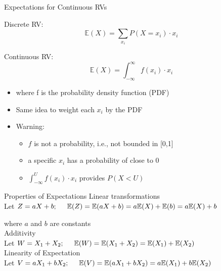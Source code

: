 \documentclass[aspectratio=169]{../latex_main/tntbeamer}  %
\begin{document}
	\begin{frame}{Expectations for Continuous RVs}
	
        Discrete RV:
	    \begin{equation}
	        \mathbb{E}(X) =  \sum_{x_i} P(X= x_i) \cdot x_i \nonumber
	    \end{equation}
	    
	    Continuous RV:
	    \begin{equation}
	        \mathbb{E}(X) =  \int^{\infty}_{-\infty} f(x_i) \cdot x_i \nonumber
	    \end{equation}
	    
	    \begin{itemize}
	        \item where f is the probability density function (PDF)
	        \item Same idea to weight each $x_i$ by the PDF
	        \item \alert{Warning}: 
	        \begin{itemize}
	            \item $f$ is not a probability, i.e., not bounded in [0,1]
	            \item a specific $x_i$ has a probability of close to $0$
	            \item $\int^{U}_{-\infty} f(x_i) \cdot x_i$ provides $P(X<U)$
	        \end{itemize}
	        
	    \end{itemize}
	    
	\end{frame}
	
	
	
	\begin{frame}[c]{Properties of Expectations}
	    Linear transformations\\
	    Let $Z = aX + b;\hspace{5mm} \mathbb{E}(Z) = \mathbb{E}( aX + b) = a\mathbb{E}(X) + \mathbb{E}(b) = a\mathbb{E}(X) + b$
	    
	    where $a$ and $b$ are constants\\[2em]
	    
	    Additivity\\
	    Let $W = X_1 + X_2; \hspace{5mm} \mathbb{E}(W) = \mathbb{E}( X_1 + X_2) =  \mathbb{E}( X_1) + \mathbb{E}(X_2)$\\[2em]

	    Linearity of Expectation\\
	    Let $V = aX_1 + bX_2;\hspace{5mm} \mathbb{E}(V) = \mathbb{E}( aX_1 + bX_2) = a\mathbb{E}(X_1) + b\mathbb{E}(X_2)  $
	\end{frame}
	
\end{document}
